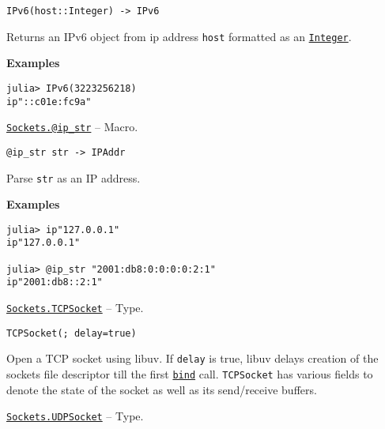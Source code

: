 \begin{adjustwidth}{2em}{0pt}


\begin{verbatim}
IPv6(host::Integer) -> IPv6
\end{verbatim}

Returns an IPv6 object from ip address \texttt{host} formatted as an \hyperlink{8469131683393450448}{\texttt{Integer}}.

\textbf{Examples}


\begin{verbatim}
julia> IPv6(3223256218)
ip"::c01e:fc9a"
\end{verbatim}



\end{adjustwidth}
\hypertarget{5293313767861803133}{}
\hyperlink{5293313767861803133}{\texttt{Sockets.@ip\_str}}  -- {Macro.}

\begin{adjustwidth}{2em}{0pt}


\begin{verbatim}
@ip_str str -> IPAddr
\end{verbatim}

Parse \texttt{str} as an IP address.

\textbf{Examples}


\begin{verbatim}
julia> ip"127.0.0.1"
ip"127.0.0.1"

julia> @ip_str "2001:db8:0:0:0:0:2:1"
ip"2001:db8::2:1"
\end{verbatim}



\end{adjustwidth}
\hypertarget{5453047654537213204}{}
\hyperlink{5453047654537213204}{\texttt{Sockets.TCPSocket}}  -- {Type.}

\begin{adjustwidth}{2em}{0pt}


\begin{verbatim}
TCPSocket(; delay=true)
\end{verbatim}

Open a TCP socket using libuv. If \texttt{delay} is true, libuv delays creation of the socket{\textquotesingle}s file descriptor till the first \hyperlink{13811388816704022260}{\texttt{bind}} call. \texttt{TCPSocket} has various fields to denote the state of the socket as well as its send/receive buffers.



\end{adjustwidth}
\hypertarget{5627851531738059255}{}
\hyperlink{5627851531738059255}{\texttt{Sockets.UDPSocket}}  -- {Type.}

